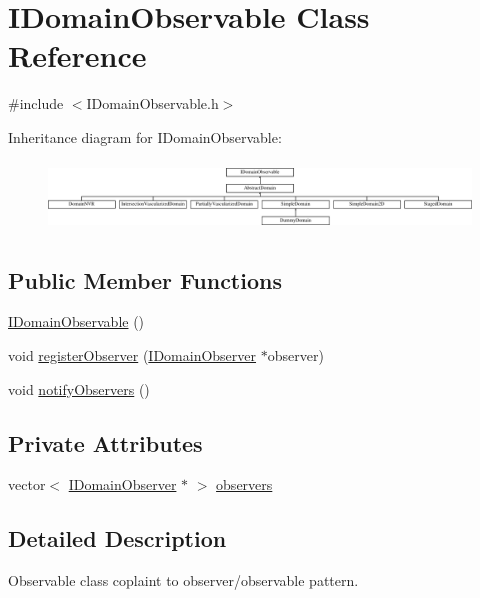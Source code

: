 \hypertarget{class_i_domain_observable}{}\section{I\+Domain\+Observable Class Reference}
\label{class_i_domain_observable}


{\ttfamily \#include $<$I\+Domain\+Observable.\+h$>$}

Inheritance diagram for I\+Domain\+Observable\+:\begin{figure}[H]
\begin{center}
\leavevmode
\includegraphics[height=1.857380cm]{d7/dc0/class_i_domain_observable}
\end{center}
\end{figure}
\subsection*{Public Member Functions}
\begin{DoxyCompactItemize}
\item 
\hyperlink{class_i_domain_observable_a4cd5c27295964fdc8acbe37898dd03b6}{I\+Domain\+Observable} ()
\item 
void \hyperlink{class_i_domain_observable_abe01724459dac9d6d72e5acbd676010b}{register\+Observer} (\hyperlink{class_i_domain_observer}{I\+Domain\+Observer} $\ast$observer)
\item 
void \hyperlink{class_i_domain_observable_a4ec3241ab4a686dd015518e0339db0f0}{notify\+Observers} ()
\end{DoxyCompactItemize}
\subsection*{Private Attributes}
\begin{DoxyCompactItemize}
\item 
vector$<$ \hyperlink{class_i_domain_observer}{I\+Domain\+Observer} $\ast$ $>$ \hyperlink{class_i_domain_observable_a0deaa551133a5b200a1127701440403d}{observers}
\end{DoxyCompactItemize}


\subsection{Detailed Description}
Observable class coplaint to observer/observable pattern. 

